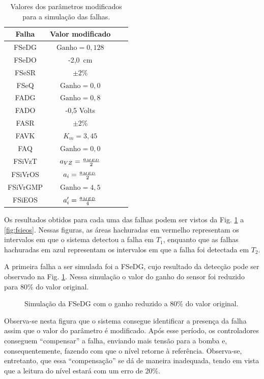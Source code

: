 \begin{table}[htb]
\centering
\caption{Valores dos parâmetros modificados para a simulação das falhas.}
\label{tab:valores_parametros}
\vspace{0.25cm}
\begin{tabular}{|c|c|c|c|}
\hline
{\bf Falha} & {\bf Valor modificado}\\
\hline
\hline
FSeDG & $\text{Ganho} = 0,128$\\
\hline
FSeDO & -2,0\ cm\\
\hline
FSeSR & $\pm 2\%$\\
\hline
FSeQ & $\text{Ganho} = 0,0$\\
\hline
\hline
FADG & $\text{Ganho} = 0,8$\\
\hline
FADO & -0,5 Volts\\
\hline
FASR & $\pm 2\%$\\
\hline
FAVK & $K_m = 3,45$\\ 
\hline
FAQ & $\text{Ganho} = 0,0$\\
\hline
\hline
FSiVzT & $a_{\tiny VZ} = \frac{a_{\tiny MED}}{2}$\\
\hline
FSiVrOS & $a_i = \frac{a_{\tiny MED}}{2}$\\
\hline
FSiVrGMP & $\text{Ganho} = 4,5$\\
\hline
FSiEOS & $a_i' = \frac{a_{\tiny MED}}{4}$\\
\hline
\end{tabular}
\end{table}

Os resultados obtidos para cada uma das falhas podem ser vistos da Fig.
\ref{fig:fsedg} a \ref{fig:fsieos}. Nessas figuras, as áreas hachuradas em
vermelho representam os intervalos em que o sistema detectou a falha em $T_1$,
enquanto que as falhas hachuradas em azul representam os intervalos em que a
falha foi detectada em $T_2$.

A primeira falha a ser simulada foi a FSeDG, cujo resultado da detecção pode ser
observado na Fig. \ref{fig:fsedg}. Nessa simulação o valor do ganho do sensor
foi reduzido para 80\% do valor original.

\begin{figure}[htb]
\footnotesize
\centering

\vspace{1cm}
\caption{Simulação da FSeDG com o ganho reduzido a 80\% do valor original.}
\label{fig:fsedg}
\end{figure}

Observa-se nesta figura que o sistema consegue identificar a presença da falha
assim que o valor do parâmetro é modificado. Após esse período, os controladores
conseguem ``compensar'' a falha, enviando mais tensão para a bomba e,
consequentemente, fazendo com que o nível retorne à referência. Observa-se,
entretanto, que essa ``compensação'' se dá de maneira inadequada, tendo em vista
que a leitura do nível estará com um erro de 20\%. 

